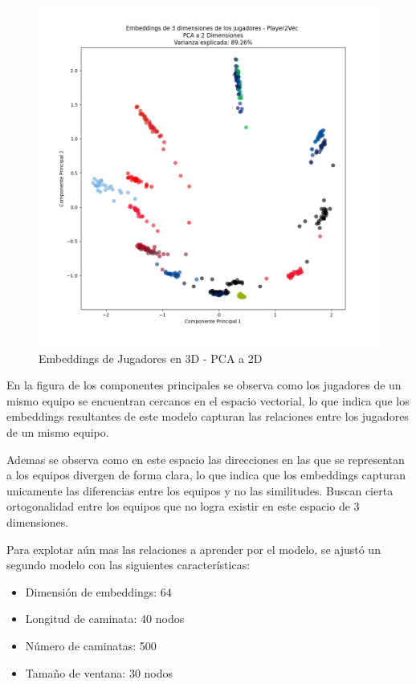 \documentclass[
  a4paper,
]{article}
\providecommand{\tightlist}{%
  \setlength{\itemsep}{0pt}\setlength{\parskip}{0pt}}
\begin{document}
\begin{figure}
  \includegraphics{recursos_pdf/graficos/players_3d_2d.png}
    \caption{Embeddings de Jugadores en 3D - PCA a 2D}
\end{figure}

En la figura de los componentes principales se observa como los
jugadores de un mismo equipo se encuentran cercanos en el espacio
vectorial, lo que indica que los embeddings resultantes de este modelo
capturan las relaciones entre los jugadores de un mismo equipo.

Ademas se observa como en este espacio las direcciones en las que se
representan a los equipos divergen de forma clara, lo que indica que los
embeddings capturan unicamente las diferencias entre los equipos y no
las similitudes. Buscan cierta ortogonalidad entre los equipos que no
logra existir en este espacio de 3 dimensiones.

Para explotar aún mas las relaciones a aprender por el modelo, se ajustó
un segundo modelo con las siguientes características:

\begin{itemize}
\tightlist
\item
  Dimensión de embeddings: 64
\item
  Longitud de caminata: 40 nodos
\item
  Número de caminatas: 500
\item
  Tamaño de ventana: 30 nodos
\end{itemize}
\end{document}
